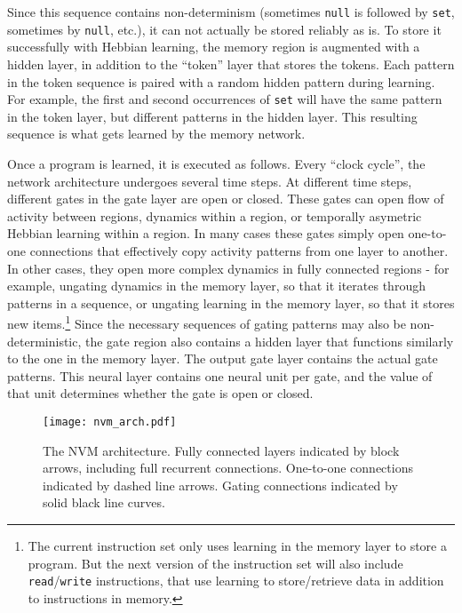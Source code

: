 \documentclass[pdftex,12pt,letterpaper]{article}
\begin{document}
Since this sequence contains non-determinism (sometimes \texttt{null} is followed by \texttt{set}, sometimes by \texttt{null}, etc.), it can not actually be stored reliably as is.  To store it successfully with Hebbian learning, the memory region is augmented with a hidden layer, in addition to the ``token'' layer that stores the tokens.  Each pattern in the token sequence is paired with a random hidden pattern during learning.  For example, the first and second occurrences of \texttt{set} will have the same pattern in the token layer, but different patterns in the hidden layer.  This resulting sequence is what gets learned by the memory network.

Once a program is learned, it is executed as follows.  Every ``clock cycle'', the network architecture undergoes several time steps.  At different time steps, different gates in the gate layer are open or closed.  These gates can open flow of activity between regions, dynamics within a region, or temporally asymetric Hebbian learning within a region.  In many cases these gates simply open one-to-one connections that effectively copy activity patterns from one layer to another.  In other cases, they open more complex dynamics in fully connected regions - for example, ungating dynamics in the memory layer, so that it iterates through patterns in a sequence, or ungating learning in the memory layer, so that it stores new items.\footnote{The current instruction set only uses learning in the memory layer to store a program.  But the next version of the instruction set will also include \texttt{read}/\texttt{write} instructions, that use learning to store/retrieve data in addition to instructions in memory.}  Since the necessary sequences of gating patterns may also be non-deterministic, the gate region also contains a hidden layer that functions similarly to the one in the memory layer.  The output gate layer contains the actual gate patterns.  This neural layer contains one neural unit per gate, and the value of that unit determines whether the gate is open or closed.

\begin{figure}[H]
\centering
\texttt{[image: nvm\_arch.pdf]}
\caption{The NVM architecture.  Fully connected layers indicated by block arrows, including full recurrent connections.  One-to-one connections indicated by dashed line arrows.  Gating connections indicated by solid black line curves.}
\label{fig:arch}
\end{figure}
\end{document}
